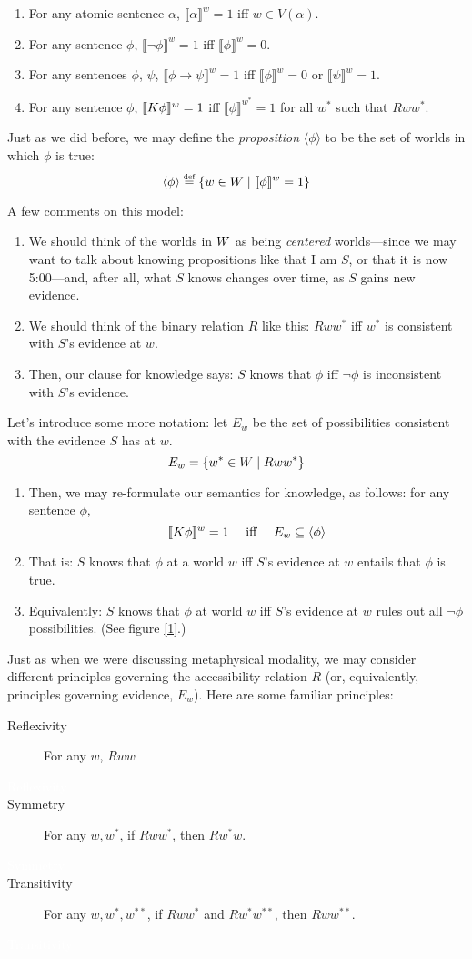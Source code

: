 \documentclass[landscape, two column, full page,reqno]{article}
\let\mathcal\relax
\newcommand{\mathcal}{\OMScal}%
\newcommand{\qe}{\begin{enumerate}}
\newcommand{\ze}{\end{enumerate}}
\newcommand{\p}{\item}
\newcommand{\e}{\emph}
\newcommand{\V}[1]{\llbracket #1 \rrbracket}
\newcommand{\K}{\mathcal{K}}
\begin{document}
	\qe
	\p For any atomic sentence $\alpha$, $\V{\alpha}^w = 1$ iff $w \in V(\alpha)$.
	\p For any sentence $\phi$, $\V{\neg \phi }^w = 1$ iff $\V{\phi}^w = 0$.
	\p For any sentences $\phi$, $\psi$, $\V{ \phi \to \psi }^w  = 1$ iff $\V{\phi}^w = 0$ or $\V{\psi}^w = 1$.
	\p For any sentence $\phi$, $\V{\K \phi}^w = 1$ iff $\V{\phi}^{w^*} = 1$ for all $w^*$ such that $Rww^*$. 
	\ze 
\p Just as we did before, we may define the \e{proposition} $\langle \phi \rangle$ to be the set of worlds in which $\phi$ is true:
			\[
			\langle \phi \rangle \stackrel{\text{\tiny def}}{=} \{ w \in \mathcal{W} \mid \V{\phi}^w = 1 \}
			\]
\p A few comments on this model:
	\qe
	\p We should think of the worlds in $\mathcal{W}$ as being \e{centered} worlds---since we may want to talk about knowing propositions like that I am $S$, or that it is now 5:00---and, after all, what $S$ knows changes over time, as $S$ gains new evidence.
	\p We should think of the binary relation $R$ like this: $Rww^*$ iff $w^*$ is consistent with $S$'s evidence at $w$.
	\p Then, our clause for knowledge says: $S$ knows that $\phi$ iff $\neg \phi$ is inconsistent with $S$'s evidence.
	\ze 
\p Let's introduce some more notation: let $E_w$ be the set of possibilities consistent with the evidence $S$ has at $w$.     
			\[
			E_w = \{  w^* \in \mathcal{W} \mid Rww^* \}
			\]
	\qe
	\p Then, we may re-formulate our semantics for knowledge, as follows: for any sentence $\phi$, 
		\[
		\V{\K \phi}^w = 1 \quad\text{ iff } \quad E_w \subseteq \langle \phi \rangle
		\]
	\p That is: $S$ knows that $\phi$ at a world $w$ iff $S$'s evidence at $w$ entails that $\phi$ is true.  
	\p Equivalently: $S$ knows that $\phi$ at world $w$ iff $S$'s evidence at $w$ rules out all $\neg \phi$ possibilities.  (See figure \ref{1}.)
	\ze 
\p Just as when we were discussing metaphysical modality, we may consider different principles governing the accessibility relation $R$ (or, equivalently, principles governing evidence, $E_w$).  Here are some familiar principles:
	\begin{description}
	\p[Reflexivity] For any $w$, $Rww$
	\p[\textcolor{white}{Reflexivity}] 
	\p[Symmetry] For any $w, w^*$, if $Rww^*$, then $Rw^*w$. 
	\p[\textcolor{white}{Symmetry}]  
	\p[Transitivity] For any $w, w^*, w^{**}$, if $Rww^*$ and $Rw^* w^{**}$, then $Rww^{**}$. 
	\p[\textcolor{white}{Transitivity}] 
	\end{description}
\end{document}
